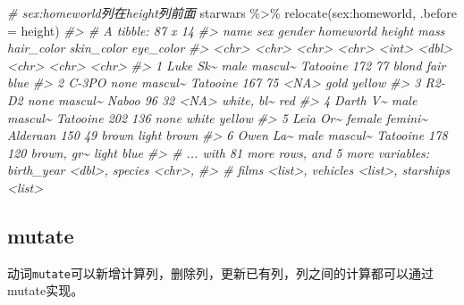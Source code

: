 \documentclass[
]{book}
\newenvironment{Shaded}{\begin{snugshade}}{\end{snugshade}}
\newcommand{\AttributeTok}[1]{\textcolor[rgb]{0.77,0.63,0.00}{#1}}
\newcommand{\CommentTok}[1]{\textcolor[rgb]{0.56,0.35,0.01}{\textit{#1}}}
\newcommand{\FunctionTok}[1]{\textcolor[rgb]{0.00,0.00,0.00}{#1}}
\newcommand{\NormalTok}[1]{#1}
\newcommand{\SpecialCharTok}[1]{\textcolor[rgb]{0.00,0.00,0.00}{#1}}
\begin{document}
\begin{Shaded}
\begin{Highlighting}[]
\CommentTok{\# sex:homeworld列在height列前面}
\NormalTok{starwars }\SpecialCharTok{\%\textgreater{}\%} \FunctionTok{relocate}\NormalTok{(sex}\SpecialCharTok{:}\NormalTok{homeworld, }\AttributeTok{.before =}\NormalTok{ height)}
\CommentTok{\#\textgreater{} \# A tibble: 87 x 14}
\CommentTok{\#\textgreater{}   name     sex    gender  homeworld height  mass hair\_color skin\_color eye\_color}
\CommentTok{\#\textgreater{}   \textless{}chr\textgreater{}    \textless{}chr\textgreater{}  \textless{}chr\textgreater{}   \textless{}chr\textgreater{}      \textless{}int\textgreater{} \textless{}dbl\textgreater{} \textless{}chr\textgreater{}      \textless{}chr\textgreater{}      \textless{}chr\textgreater{}    }
\CommentTok{\#\textgreater{} 1 Luke Sk\textasciitilde{} male   mascul\textasciitilde{} Tatooine     172    77 blond      fair       blue     }
\CommentTok{\#\textgreater{} 2 C{-}3PO    none   mascul\textasciitilde{} Tatooine     167    75 \textless{}NA\textgreater{}       gold       yellow   }
\CommentTok{\#\textgreater{} 3 R2{-}D2    none   mascul\textasciitilde{} Naboo         96    32 \textless{}NA\textgreater{}       white, bl\textasciitilde{} red      }
\CommentTok{\#\textgreater{} 4 Darth V\textasciitilde{} male   mascul\textasciitilde{} Tatooine     202   136 none       white      yellow   }
\CommentTok{\#\textgreater{} 5 Leia Or\textasciitilde{} female femini\textasciitilde{} Alderaan     150    49 brown      light      brown    }
\CommentTok{\#\textgreater{} 6 Owen La\textasciitilde{} male   mascul\textasciitilde{} Tatooine     178   120 brown, gr\textasciitilde{} light      blue     }
\CommentTok{\#\textgreater{} \# ... with 81 more rows, and 5 more variables: birth\_year \textless{}dbl\textgreater{}, species \textless{}chr\textgreater{},}
\CommentTok{\#\textgreater{} \#   films \textless{}list\textgreater{}, vehicles \textless{}list\textgreater{}, starships \textless{}list\textgreater{}}
\end{Highlighting}
\end{Shaded}

\hypertarget{dplyr-mutate}{%
\subsection{mutate}\label{dplyr-mutate}}

动词\texttt{mutate}可以新增计算列，删除列，更新已有列，列之间的计算都可以通过mutate实现。
\end{document}

